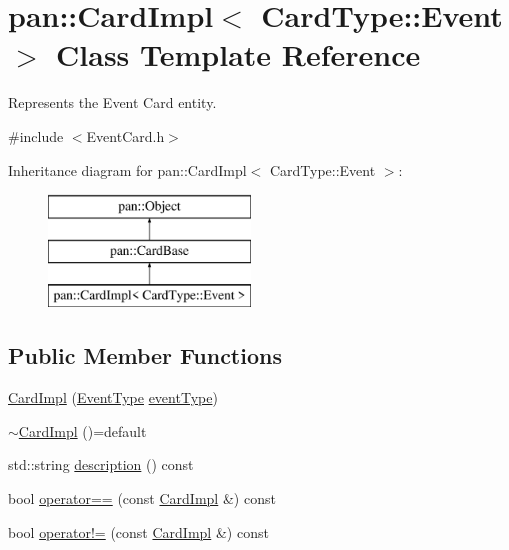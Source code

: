 \hypertarget{classpan_1_1_card_impl_3_01_card_type_1_1_event_01_4}{}\section{pan\+:\+:Card\+Impl$<$ Card\+Type\+:\+:Event $>$ Class Template Reference}
\label{classpan_1_1_card_impl_3_01_card_type_1_1_event_01_4}


Represents the Event Card entity.  




{\ttfamily \#include $<$Event\+Card.\+h$>$}

Inheritance diagram for pan\+:\+:Card\+Impl$<$ Card\+Type\+:\+:Event $>$\+:\begin{figure}[H]
\begin{center}
\leavevmode
\includegraphics[height=3.000000cm]{classpan_1_1_card_impl_3_01_card_type_1_1_event_01_4}
\end{center}
\end{figure}
\subsection*{Public Member Functions}
\begin{DoxyCompactItemize}
\item 
\hyperlink{classpan_1_1_card_impl_3_01_card_type_1_1_event_01_4_ad31a4637fd5d1c1c2aac120109b3c4e8}{Card\+Impl} (\hyperlink{namespacepan_a9221a73b34e019e6b8fe6f84e6417513}{Event\+Type} \hyperlink{classpan_1_1_card_impl_3_01_card_type_1_1_event_01_4_a575f1457eebafca8f0c975bdec2258e2}{event\+Type})
\item 
\hyperlink{classpan_1_1_card_impl_3_01_card_type_1_1_event_01_4_a57a0df69033b57c0476c3d58599cb079}{$\sim$\+Card\+Impl} ()=default
\item 
std\+::string \hyperlink{classpan_1_1_card_impl_3_01_card_type_1_1_event_01_4_aa5c7d2729e0bfb141a0d8487a590a580}{description} () const
\item 
bool \hyperlink{classpan_1_1_card_impl_3_01_card_type_1_1_event_01_4_af97461f7279365bc5bd0c0490a51b13f}{operator==} (const \hyperlink{classpan_1_1_card_impl}{Card\+Impl} \&) const
\item 
bool \hyperlink{classpan_1_1_card_impl_3_01_card_type_1_1_event_01_4_aac9dd96956122fdb62852408e86d767e}{operator!=} (const \hyperlink{classpan_1_1_card_impl}{Card\+Impl} \&) const
\end{DoxyCompactItemize}
